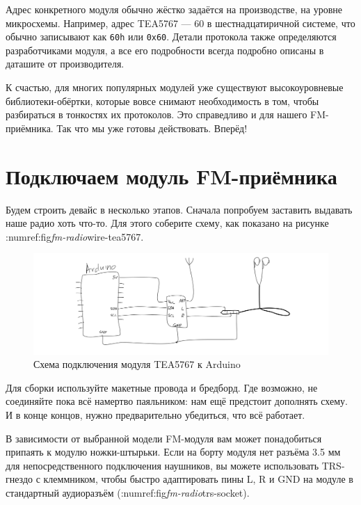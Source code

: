 Адрес конкретного модуля обычно жёстко задаётся на производстве, на уровне микросхемы. Например, адрес TEA5767 — 60 в шестнадцатиричной системе, что обычно записывают как \texttt{60h} или \texttt{0x60}.  Детали протокола также определяются разработчиками модуля, а все его подробности всегда подробно описаны в даташите от производителя.

К счастью, для многих популярных модулей уже существуют высокоуровневые библиотеки-обёртки, которые вовсе снимают необходимость в том, чтобы разбираться в тонкостях их протоколов. Это справедливо и для нашего FM-приёмника. Так что мы уже готовы действовать. Вперёд!

\section{Подключаем модуль FM-приёмника}


Будем строить девайс в несколько этапов. Сначала попробуем заставить выдавать наше радио хоть что-то. Для этого соберите схему, как показано на рисунке :numref:fig\emph{fm-radio}wire-tea5767.

\begin{figure}
\centering
\includegraphics{sketches/tea5767-wiring}
\caption{Схема подключения модуля TEA5767 к Arduino}
\end{figure}

Для сборки используйте макетные провода и бредборд. Где возможно, не соединяйте пока всё намертво паяльником: нам ещё предстоит дополнять схему. И в конце концов, нужно предварительно убедиться, что всё работает.


В зависимости от выбранной модели FM-модуля вам может понадобиться припаять к модулю ножки-штырьки. Если на борту модуля нет разъёма 3.5 мм для непосредственного подключения наушников, вы можете использовать TRS-гнездо с клеммником, чтобы быстро адаптировать пины L, R и GND на модуле в стандартный аудиоразъём (:numref:fig\emph{fm-radio}trs-socket).


